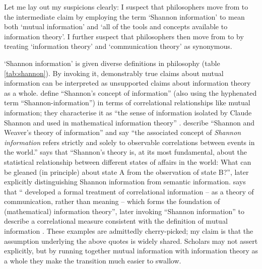 Let me lay out my suspicions clearly: I suspect that philosophers move from \ami{} to the intermediate claim \ait{} by employing the term `Shannon information' to mean both `mutual information' and `all of the tools and concepts available to information theory'.
I further suspect that philosophers then move from \ait{} to \act{} by treating `information theory' and `communication theory' as synonymous.

`Shannon information' is given diverse definitions in philosophy (table \ref{tab:shannon}).
By invoking it, demonstrably true claims about mutual information can be interpreted as unsupported claims about information theory as a whole.
\citet[$\S$2]{godfrey-smith2016biological} define ``Shannon's concept of information'' (also using the hyphenated term ``Shannon-information'') in terms of correlational relationships like mutual information; they characterise it as ``the sense of information isolated by Claude Shannon and used in mathematical information theory'' \citep[1]{godfrey-smith2016biological}.
\citet[759]{owren2010redefining} describe ``Shannon and Weaver's \parencite*{shannon1949mathematical} theory of information'' and say ``the associated concept of \textit{Shannon information} refers strictly and solely to observable correlations between events in the world.''
\citet[$\S$6.1]{dennett2017bacteria} says that ``Shannon's theory is, at its most fundamental, about the statistical relationship between different states of affairs in the world: What can be gleaned (in principle) about state A from the observation of state B?'', later explicitly distinguishing Shannon information from semantic information.
\citet[p. 12, n. 11]{shea2018representation} says that ``\citet{shannon1948mathematicalc} developed a formal treatment of correlational information -- as a theory of communication, rather than meaning -- which forms the foundation of (mathematical) information theory'', later invoking ``Shannon information'' to describe a correlational measure consistent with the definition of mutual information \citep[p. 78, n. 5]{shea2018representation}.
These examples are admittedly cherry-picked; my claim is that the assumption underlying the above quotes is widely shared.
Scholars may not assert \ait{} explicitly, but by running together mutual information with information theory as a whole they make the transition much easier to swallow.

